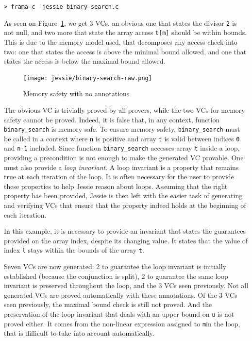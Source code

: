 \documentclass[a4paper,11pt,twoside,openright]{report}
\begin{document}
\begin{verbatim}
> frama-c -jessie binary-search.c
\end{verbatim}

As seen on Figure~\ref{fig:raw}, we get 3 VCs, an obvious one that
states the divisor \verb|2| is not null, and two more that state the
array access \verb|t[m]| should be within bounds. This is due to the
memory model used, that decomposes any access check into two: one that
states the access is above the minimal bound allowed, and one that
states the access is below the maximal bound allowed.

\begin{figure}[t]
  \begin{center}
  \texttt{[image: jessie/binary-search-raw.png]}
  \end{center}
  \caption{Memory safety with no annotations}
  \label{fig:raw}
  \hrulefill
\end{figure}

The obvious VC is trivially proved by all provers, while the two VCs
for memory safety cannot be proved. Indeed, it is false that, in any
context, function \verb|binary_search| is memory safe. To ensure
memory safety, \verb|binary_search| must be called in a context 
where \verb|n| is positive and array \verb|t| is valid
between indices \verb|0| and \verb|n-1| included. Since function
\verb|binary_search| accesses array \verb|t| inside a loop, 
providing a precondition is not
enough to make the generated VC provable.
One must also provide a {\em loop invariant}. A loop invariant
is a property that remains true at each iteration of the loop.
It is often necessary for the user to provide these properties
to help Jessie reason about loops. Assuming that the right property
has been provided, Jessie is then left with the easier task of
generating and verifying VCs that ensure that the property indeed
holds at the beginning of each iteration.

In this example, it is necessary to provide an invariant 
that states the guarantees provided on the array 
index, despite its changing value. It
states that the value of index \verb|l| stays within the bounds of the
array \verb|t|.



Seven VCs are now generated: 2 to guarantee the loop invariant is
initially established (because the conjunction is split), 2 to guarantee
the same loop invariant is preserved throughout the loop, and the 3 VCs
seen previously. Not all generated VCs are proved automatically with
these annotations. Of the 3 VCs seen previously, the maximal bound
check is still not proved. And the preservation of the loop invariant
that deals with an upper bound on \verb|u| is not proved either. It
comes from the non-linear expression assigned to \verb|m|in the loop,
that is difficult to take into account automatically. 
\end{document}
